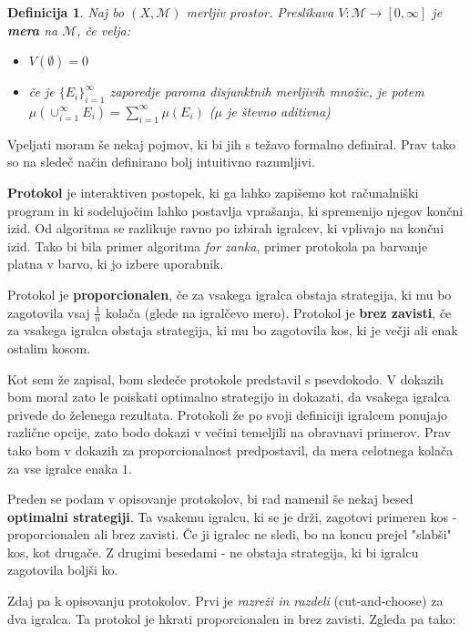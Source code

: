 \documentclass[a4paper, 12pt]{article}
\newtheorem{definicija}{Definicija}
\begin{document}
	\begin{definicija}
		Naj bo $(X, \mathcal{M})$ merljiv prostor. Preslikava $V : \mathcal{M} \to [0, \infty]$ je \textbf{mera} na $\mathcal{M}$, če velja:
		\begin{itemize}
			\item $V(\emptyset) = 0$
			\item če je $\{E_i\}_{i=1}^{\infty}$ zaporedje paroma disjunktnih merljivih množic, je potem $\mu(\cup_{i=1}^{\infty}E_i) = \sum_{i=1}^{\infty} \mu(E_i)$ ($\mu$ je števno aditivna)
		\end{itemize}		
	\end{definicija}

	Vpeljati moram še nekaj pojmov, ki bi jih s težavo formalno definiral. Prav tako so na sledeč način definirano bolj intuitivno razumljivi.
	
	\textbf{Protokol} je interaktiven postopek, ki ga lahko zapišemo kot računalniški program in ki sodelujočim lahko postavlja vprašanja, ki spremenijo njegov končni izid. Od algoritma se razlikuje ravno po izbirah igralcev, ki vplivajo na končni izid. Tako bi bila primer algoritma \textit{for zanka}, primer protokola pa barvanje platna v barvo, ki jo izbere uporabnik.
	
	Protokol je \textbf{proporcionalen}, če za vsakega igralca obstaja strategija, ki mu bo zagotovila vsaj $\frac{1}{n}$ kolača (glede na igralčevo mero). Protokol je \textbf{brez zavisti}, če za vsakega igralca obstaja strategija, ki mu bo zagotovila kos, ki je večji ali enak ostalim kosom. 
	
	Kot sem že zapisal, bom sledeče protokole predstavil s psevdokodo. V dokazih bom moral zato le poiskati optimalno strategijo in dokazati, da vsakega igralca privede do želenega rezultata. Protokoli že po svoji definiciji igralcem ponujajo različne opcije, zato bodo dokazi v večini temeljili na obravnavi primerov. Prav tako bom v dokazih za proporcionalnost predpostavil, da mera celotnega kolača za vse igralce enaka $1$. 
	
	Preden se podam v opisovanje protokolov, bi rad namenil še nekaj besed \textbf{optimalni strategiji}. Ta vsakemu igralcu, ki se je drži, zagotovi primeren kos - proporcionalen ali brez zavisti. Če ji igralec ne sledi, bo na koncu prejel "slabši" kos, kot drugače. Z drugimi besedami - ne obstaja strategija, ki bi igralcu zagotovila boljši ko. 
	
	Zdaj pa k opisovanju protokolov. Prvi je \textit{razreži in razdeli} (cut-and-choose) za dva igralca. Ta protokol je hkrati proporcionalen in brez zavisti. Zgleda pa tako:
	
\end{document}
